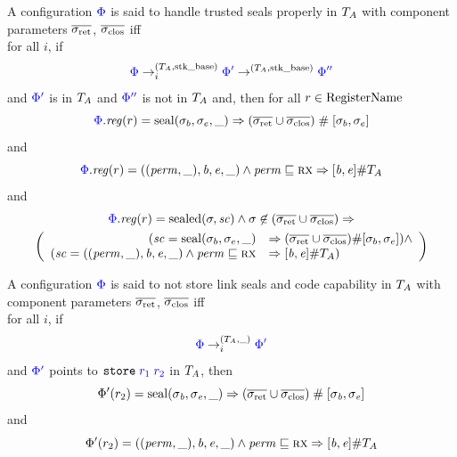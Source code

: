 \documentclass[a4paper]{article}
\begin{document}
\begin{definition}
  \label{def:handle-trusted-seals-properly}
  A configuration $\src{\Phi}$ is said to handle trusted seals properly in $\ta$ with component parameters $\sigrets$, $\sigcloss$ iff\\
  for all $i$, if
  \[
    \src{\Phi} \nstep[i]{(\ta,\stkb)} \src{\Phi'} \step[(\ta,\stkb)] \src{\Phi''}
  \]
  and $\src{\Phi'}$ is in $\ta$ and $\src{\Phi''}$ is not in $\ta$ and, then for all $r \in \RegName$
  \[
    \src{\Phi}.\reg(r) = \seal{\sigma_b,\sigma_e,\_} \Rightarrow (\sigrets \cup \sigcloss) \mathrel{\#} [\sigma_b,\sigma_e]
  \]
and
  \[
    \src{\Phi}.\reg(r) = ((\perm,\_),\baddr,\eaddr,\_) \wedge \perm \sqsubseteq \rx \Rightarrow [\baddr,\eaddr] \# \ta
  \]
  and
    \begin{multline*}
      \src{\Phi}.\reg(r) = \sealed{\sigma,\vsc} \wedge \sigma \not\in (\sigrets\cup\sigcloss) \Rightarrow 
      \\  \left(  
      \begin{array}{r l}
        (\vsc = \seal{\sigma_b,\sigma_e,\_} & \Rightarrow (\sigrets\cup\sigcloss) \# [\sigma_b,\sigma_e]) \wedge\\
        ( \vsc = ((\perm,\_),\baddr,\eaddr,\_) \wedge \perm \sqsubseteq \rx & \Rightarrow [\baddr,\eaddr] \# \ta )
      \end{array}
      \right)
  \end{multline*}
\end{definition}

\begin{definition}
  \label{def:never-store-seal-code-cap}
  A configuration $\src{\Phi}$ is said to not store link seals and code capability in $\ta$ with component parameters $\sigrets$, $\sigcloss$ iff\\
  for all $i$, if
  \[
    \src{\Phi} \nstep[i]{(\ta,\_)} \src{\Phi'}
  \]
  and $\src{\Phi'}$ points to $\src{\tstore{r_1}{r_2}}$ in $\ta$, then 
\[
  \Phi'(r_2) = \seal{\sigma_\baddr,\sigma_\eaddr,\_} \Rightarrow (\sigrets\cup\sigcloss) \mathrel{\#} [\sigma_\baddr,\sigma_\eaddr]
\]
and
\[
  \Phi'(r_2) = ((\perm,\_),\baddr,\eaddr,\_) \wedge \perm \sqsubseteq \rx \Rightarrow [\baddr,\eaddr] \# \ta
\]
\end{definition}
\end{document}
